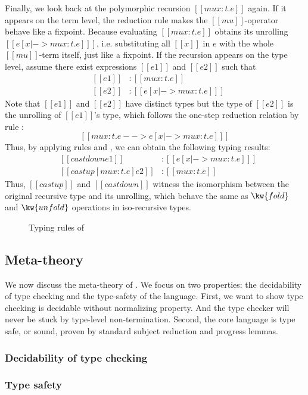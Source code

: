 Finally, we look back at the polymorphic recursion $[[mu x:t.e]]$ again. If it appears on the term level, the reduction rule  makes the $[[mu]]$-operator behave like a fixpoint. Because evaluating $[[mu x:t.e]]$ obtains its unrolling $[[e [x |-> mu x:t.e] ]]$, i.e. substituting all $[[x]]$ in $e$ with the whole $[[mu]]$-term itself, just like a fixpoint. If the recursion appears on the type level, assume there exist expressions $[[e1]]$ and $[[e2]]$ such that 
\[\begin{array}{lll}
	&[[e1]] &: [[mu x:t.e]]\\
	&[[e2]] &: [[e [x |-> mu x:t.e] ]]
\end{array}\]
Note that $[[e1]]$ and $[[e2]]$ have distinct types but the type of $[[e2]]$ is the unrolling of $[[e1]]$'s type, which follows the one-step reduction relation by rule :
\[ [[mu x:t.e --> e [x |-> mu x:t.e] ]] \]
 Thus, by applying rules  and , we can obtain the following typing results:
\[\begin{array}{lll}
	&[[castdown e1]] &: [[e [x |-> mu x:t.e] ]]\\
	&[[castup [mu x:t.e] e2]] &: [[mu x:t.e]]
\end{array}\]
Thus, $[[castup]]$ and $[[castdown]]$ witness the isomorphism between the original recursive type and its unrolling, which behave the same as $\kw{fold}$ and $\kw{unfold}$ operations in iso-recursive types.

\begin{figure}
    \ottdefnctx{}
    \ottdefnexpr{}
    \caption{Typing rules of \name}
    \label{fig:core:typing}
\end{figure}

\subsection{Meta-theory}\label{sec:core:meta}
We now discuss the meta-theory of \name. We focus on two properties: the decidability of type checking and the type-safety of the language. First, we want to show type checking \name is decidable without normalizing property. And the type checker will never be stuck by type-level non-termination. Second, the core language is type safe, or sound, proven by standard subject reduction and progress lemmas.

\subsubsection{Decidability of type checking}

\subsubsection{Type safety}
